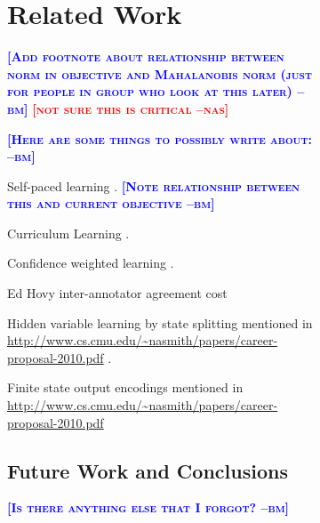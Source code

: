 \documentclass{article} %
\newcommand{\bmcomment}[1]{\textcolor{blue}{\textsc{\textbf{[#1 --bm]}}}}
\newcommand{\nascomment}[1]{\textcolor{red}{\textsc{\textbf{[#1 --nas]}}}}
\begin{document}
\begin{figure}
\begin{subfigure}[b]{0.30\textwidth}


\section{Related Work}

\bmcomment{Add footnote about relationship between norm in objective 
and
Mahalanobis norm (just for people in group who look at 
this later)} \nascomment{not sure this is critical}

\bmcomment{Here are some things to possibly write about:}

Self-paced learning \citep{kumar2010self}. \bmcomment{Note relationship
between this and current objective}

Curriculum Learning \citep{bengio2009curriculum}.

Confidence weighted learning \citep{dredze2008confidence}.

Ed Hovy inter-annotator agreement cost \citep{plank2014learning}

Hidden variable learning by state splitting mentioned in 
\url{http://www.cs.cmu.edu/~nasmith/papers/career-proposal-2010.pdf} 
\citep{petrov2011coarse}.

Finite state output encodings mentioned in 
\url{http://www.cs.cmu.edu/~nasmith/papers/career-proposal-2010.pdf}
\citep{loper2008encoding}

\subsection{Future Work and Conclusions}

\bmcomment{Is there anything else that I forgot?}


\end{subfigure}
\end{figure}
\end{document}
